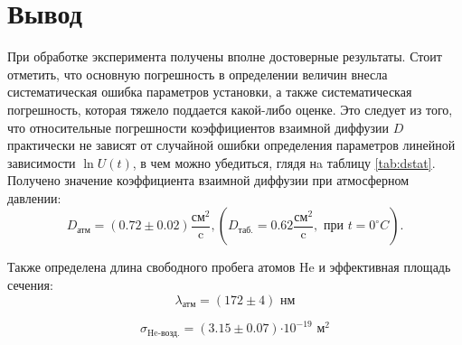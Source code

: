 \documentclass[12pt,a4paper]{article}
\newcommand{\e}[1]{\text{$\cdot10^{#1}$}}
\begin{document}
\section*{Вывод}
	При обработке эксперимента получены вполне достоверные результаты.
	Стоит отметить, что основную погрешность в определении величин внесла систематическая ошибка параметров установки, а также систематическая погрешность, которая тяжело поддается какой-либо оценке. Это следует из того, что относительные погрешности коэффициентов взаимной диффузии $D$ практически не зависят от случайной ошибки определения параметров линейной зависимости $\ln{U}(t)$, в чем можно убедиться, глядя нa таблицу \ref{tab:dstat}. 
	Получено значение коэффициента взаимной диффузии при атмосферном давлении:
	$$D_\text{атм} = (0.72\pm 0.02)\frac{\text{см}^2}{\text{c}}, \left( D_\text{таб.} = 0.62 \frac{\text{см}^2}{\text{c}}, \text{ при } t = 0^{\circ} C\right).$$
	
	Также определена длина свободного пробега атомов He и эффективная площадь сечения:
	$$\lambda_{\text{атм}} = (172 \pm 4) \text{ нм}$$
	
	$$\sigma_{\text{He-возд.}} = (3.15 \pm 0.07)\e{-19} \text{ м}^2$$
\end{document}

